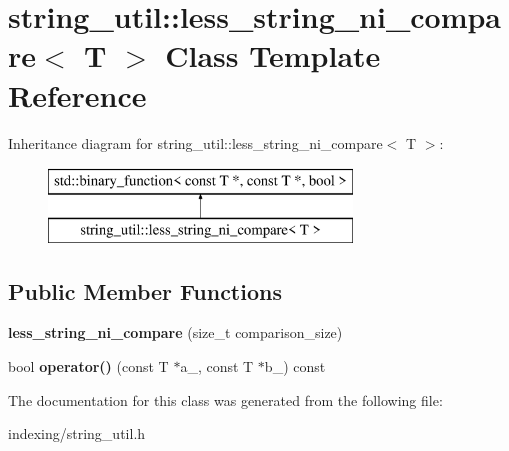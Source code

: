 \hypertarget{classstring__util_1_1less__string__ni__compare}{\section{string\-\_\-util\-:\-:less\-\_\-string\-\_\-ni\-\_\-compare$<$ T $>$ Class Template Reference}
\label{classstring__util_1_1less__string__ni__compare}
}
Inheritance diagram for string\-\_\-util\-:\-:less\-\_\-string\-\_\-ni\-\_\-compare$<$ T $>$\-:\begin{figure}[H]
\begin{center}
\leavevmode
\includegraphics[height=2.000000cm]{classstring__util_1_1less__string__ni__compare}
\end{center}
\end{figure}
\subsection*{Public Member Functions}
\begin{DoxyCompactItemize}
\item 
\hypertarget{classstring__util_1_1less__string__ni__compare_aec49bc79089ab2e54ff4752bbbabe6bf}{{\bfseries less\-\_\-string\-\_\-ni\-\_\-compare} (size\-\_\-t comparison\-\_\-size)}\label{classstring__util_1_1less__string__ni__compare_aec49bc79089ab2e54ff4752bbbabe6bf}

\item 
\hypertarget{classstring__util_1_1less__string__ni__compare_a6050f7d7b4998343cc5c46dca8b28bcc}{bool {\bfseries operator()} (const T $\ast$a\-\_\-, const T $\ast$b\-\_\-) const }\label{classstring__util_1_1less__string__ni__compare_a6050f7d7b4998343cc5c46dca8b28bcc}

\end{DoxyCompactItemize}


The documentation for this class was generated from the following file\-:\begin{DoxyCompactItemize}
\item 
indexing/string\-\_\-util.\-h\end{DoxyCompactItemize}
